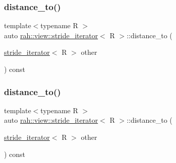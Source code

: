 \subsubsection{\texorpdfstring{distance\_to()}{distance\_to()}\hspace{0.1cm}{\footnotesize\ttfamily [1/2]}}
{\footnotesize\ttfamily template$<$typename R $>$ \\
auto \mbox{\hyperlink{structrah_1_1view_1_1stride__iterator}{rah\+::view\+::stride\+\_\+iterator}}$<$ R $>$\+::distance\+\_\+to (\begin{DoxyParamCaption}\item[{\mbox{\hyperlink{structrah_1_1view_1_1stride__iterator}{stride\+\_\+iterator}}$<$ R $>$}]{other }\end{DoxyParamCaption}) const\hspace{0.3cm}{\ttfamily [inline]}}

\mbox{\label{structrah_1_1view_1_1stride__iterator_ad30be3983aec3fab52efb32a1a461056}} 
\subsubsection{\texorpdfstring{distance\_to()}{distance\_to()}\hspace{0.1cm}{\footnotesize\ttfamily [2/2]}}
{\footnotesize\ttfamily template$<$typename R $>$ \\
auto \mbox{\hyperlink{structrah_1_1view_1_1stride__iterator}{rah\+::view\+::stride\+\_\+iterator}}$<$ R $>$\+::distance\+\_\+to (\begin{DoxyParamCaption}\item[{\mbox{\hyperlink{structrah_1_1view_1_1stride__iterator}{stride\+\_\+iterator}}$<$ R $>$}]{other }\end{DoxyParamCaption}) const\hspace{0.3cm}{\ttfamily [inline]}}

\mbox{\label{structrah_1_1view_1_1stride__iterator_a34c24e935ee7beebcd7269ee314e245a}} 
